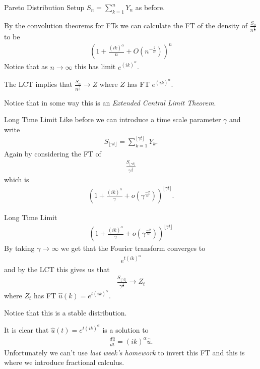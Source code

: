 \documentclass[pdf]{beamer}
\newcommand{\lra}{\longrightarrow}
\begin{document}
\begin{frame}{Pareto Distribution}
    Setup $ S_n = \sum_{k=1}^n Y_n $ as before.
    
    By the convolution theorems for FTs we can calculate the FT of the density of $ \frac{S_n}{n^\frac{1}{\alpha}} $ to be
    \begin{align}
        \left( 1 + \frac{(ik)^\alpha}{n} + O(n^{-\frac{2}{\alpha}}) \right)^n
    \end{align}
    Notice that as $ n \lra \infty $ this has limit $ e^{(ik)^\alpha} $.
    
    The LCT implies that $ \frac{S_n}{n^\frac{1}{\alpha}} \lra Z $ where $ Z $ has FT $ e^{(ik)^\alpha} $.
    
    Notice that in some way this is an \emph{Extended Central Limit Theorem}.
\end{frame}

\begin{frame}{Long Time Limit}
    Like before we can introduce a time scale parameter $ \gamma $ and write
    \begin{align}
        S_{\lfloor \gamma t \rfloor} = \sum_{k=1}^{\lfloor \gamma t \rfloor}Y_k.
    \end{align}
    Again by considering the FT of 
    \begin{align}
        \frac{S_{\lfloor \gamma t \rfloor}}{\gamma^\frac{1}{\alpha}}
    \end{align}
    which is
    \begin{align}
        \left( 1 + \frac{(ik)^\alpha}{\gamma} + o(\gamma^\frac{-2}{\alpha})\right)^{\lfloor \gamma t \rfloor}.
    \end{align}
\end{frame}

\begin{frame}{Long Time Limit}
    \begin{align}
            \left( 1 + \frac{(ik)^\alpha}{\gamma} + o(\gamma^\frac{-2}{\alpha})\right)^{\lfloor \gamma t \rfloor}
        \end{align}
        By taking $ \gamma \lra \infty $ we get that the Fourier transform converges to
        \begin{align}
            e^{t(ik)^\alpha}
        \end{align}
    and by the LCT this gives us that 
    \begin{align}
        \frac{S_{\lfloor \gamma t \rfloor}}{\gamma^\frac{1}{\alpha}} \lra Z_t
    \end{align}
    where $ Z_t $ has FT $ \hat{u}(k) = e^{t(ik)^\alpha} $.
    
    Notice that this is a stable distribution.
\end{frame}
\begin{frame}
    It is clear that $ \hat{u}(t) = e^{t(ik)^\alpha} $ is a solution to
    \begin{align}
        \frac{d\hat{u}}{dt} = (ik)^\alpha \hat{u}.
    \end{align}
    Unfortunately we can't use \emph{last week's homework} to invert this FT and this is where we introduce fractional calculus.
\end{frame}
\end{document}
